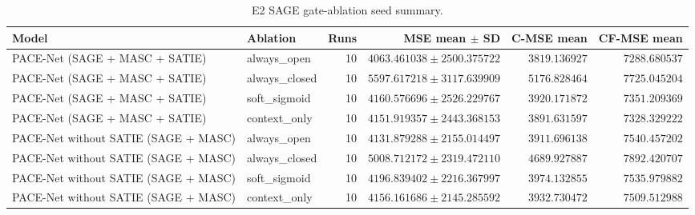 \begin{table}[t]
\centering
\small
\begin{tabular}{llrrrr}
\hline
Model & Ablation & Runs & MSE mean $\pm$ SD & C-MSE mean & CF-MSE mean \\
\hline
PACE-Net (SAGE + MASC + SATIE) & always_open & 10 & $4063.461038 \pm 2500.375722$ & $3819.136927$ & $7288.680537$ \\
PACE-Net (SAGE + MASC + SATIE) & always_closed & 10 & $5597.617218 \pm 3117.639909$ & $5176.828464$ & $7725.045204$ \\
PACE-Net (SAGE + MASC + SATIE) & soft_sigmoid & 10 & $4160.576696 \pm 2526.229767$ & $3920.171872$ & $7351.209369$ \\
PACE-Net (SAGE + MASC + SATIE) & context_only & 10 & $4151.919357 \pm 2443.368153$ & $3891.631597$ & $7328.329222$ \\
PACE-Net without SATIE (SAGE + MASC) & always_open & 10 & $4131.879288 \pm 2155.014497$ & $3911.696138$ & $7540.457202$ \\
PACE-Net without SATIE (SAGE + MASC) & always_closed & 10 & $5008.712172 \pm 2319.472110$ & $4689.927887$ & $7892.420707$ \\
PACE-Net without SATIE (SAGE + MASC) & soft_sigmoid & 10 & $4196.839402 \pm 2216.367997$ & $3974.132855$ & $7535.979882$ \\
PACE-Net without SATIE (SAGE + MASC) & context_only & 10 & $4156.161686 \pm 2145.285592$ & $3932.730472$ & $7509.512988$ \\
\hline
\end{tabular}
\caption{E2 SAGE gate-ablation seed summary.}
\end{table}
